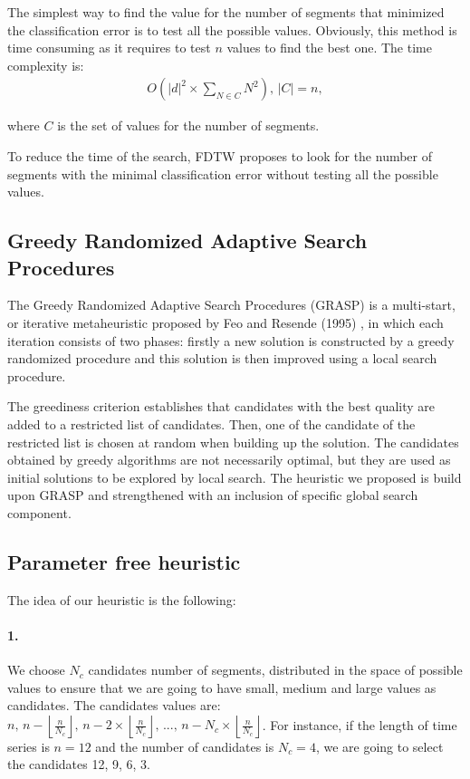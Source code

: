 The simplest way to find the value for the number of segments that minimized the
classification error is to test all the possible values.  Obviously, this
method is time consuming as it requires to test $n$ values to find the best one. The time complexity is:
\begin{eqnarray}
O(|d|^{2} \times \underset{N\in C}{\sum}{\displaystyle
N^{2}}),\, |C|=n,
\end{eqnarray}

where $C$ is the set of values for the number of segments.

To reduce the time of the search,  FDTW proposes to look for the
number of segments with the minimal classification error without testing all the possible values.

\subsection{ Greedy Randomized Adaptive Search Procedures}
The Greedy Randomized Adaptive Search Procedures (GRASP) is a multi-start, or iterative metaheuristic proposed by Feo and Resende
(1995) \cite{feo1995greedy}, in which each iteration consists of two phases:
firstly a new solution is constructed by a greedy randomized
procedure and this solution is then improved using a local search procedure.


The greediness criterion establishes that candidates with the best quality are
 added to a restricted list of candidates. Then, one of the candidate of the restricted list is  chosen at random when
building up the solution. The candidates obtained by greedy algorithms are not
necessarily optimal, but they are used as initial solutions
to be explored by local search. The heuristic  we proposed is build upon
GRASP and strengthened with an inclusion of specific global search component.




\subsection{Parameter free heuristic}
The idea of our heuristic is the following:
\paragraph{1.} We choose $N_{c}$ candidates number of segments, distributed in the space of possible values
to ensure that we are going to have small, medium and large values as
candidates. The candidates values are: $n,\,n-\left\lfloor
\frac{n}{N_{c}}\right\rfloor ,\,n-2\times\left\lfloor \frac{n}{N_{c}}\right\rfloor
,\,...,\,n-N_{c}\times\left\lfloor \frac{n}{N_{c}}\right\rfloor $. For instance, if the length of
time series is $n = 12$ and the number of candidates is $N_c = 4$, we are going to select the
candidates 12, 9, 6, 3.

